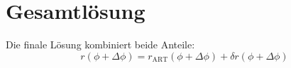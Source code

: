 \section{Gesamtlösung}
Die finale Lösung kombiniert beide Anteile:
\[
r(\phi + \Delta \phi) = r_{\text{ART}}(\phi + \Delta \phi) + \delta r(\phi + \Delta \phi)
\]
